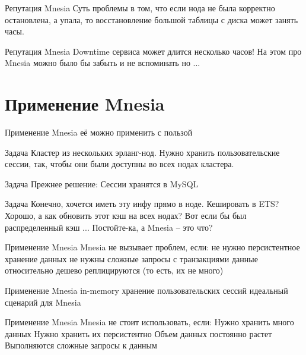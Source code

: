 \documentclass[9pt]{beamer}
\begin{document}
\begin{frame}
 Репутация Mnesia
Суть проблемы в том,
что если нода не была корректно остановлена, а упала,
то восстановление большой таблицы с диска может занять часы.
\end{frame}

\begin{frame}
 Репутация Mnesia
Downtime сервиса может длится несколько часов!
На этом про Mnesia можно было бы забыть и не вспоминать
но ...
\end{frame}

\section{Применение Mnesia}

\begin{frame}
 Применение Mnesia
её можно применить с пользой
\end{frame}

\begin{frame}
 Задача
Кластер из нескольких эрланг-нод.
Нужно хранить пользовательские сессии,
так, чтобы они были доступны во всех нодах кластера.
\end{frame}

\begin{frame}
 Задача
Прежнее решение:
Сессии хранятся в MySQL
\end{frame}

\begin{frame}
 Задача
Конечно, хочется иметь эту инфу прямо в ноде.
Кешировать в ETS?
Хорошо, а как обновить этот кэш на всех нодах?
Вот если бы был распределенный кэш ...
Постойте-ка, а Mnesia -- это что?
\end{frame}

\begin{frame}
 Применение Mnesia
Mnesia не вызывает проблем, если:
не нужно персистентное хранение данных
не нужны сложные запросы с транзакциями
данные относительно дешево реплицируются (то есть, их не много)
\end{frame}

\begin{frame}
 Применение Mnesia
in-memory хранение пользовательских сессий
идеальный сценарий для Mnesia
\end{frame}

\begin{frame}
 Применение Mnesia
Mnesia не стоит использовать, если:
Нужно хранить много данных
Нужно хранить их персистентно
Объем данных постоянно растет
Выполняются сложные запросы к данным
\end{frame}
\end{document}
